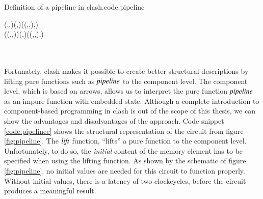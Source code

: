 \begin{texexptitled}{Definition of a pipeline in \gls{clash}.}{code:pipeline}\begin{hscode}\SaveRestoreHook
{}%
%
%
%
%
%
\>[3]{}\mathbin{::}\;(,,)\to (,)\to (\;(,,),){}\<[E]%
\\
\>[3]{}\;(\;(,,))\;(,){}\<[38]%
\>[38]{}\mathrel{=}(\;(,,),){}\<[E]%
\\
\>[3]{}\<[6]%
\>[6]{}\;{}\<[13]%
\>[13]{}\mathrel{=}\mathbin{*}\<[E]%
\\
\>[13]{}\mathrel{=}\<[E]%
\\
\>[13]{}\mathrel{=}\mathbin{+}\<[E]%
\ColumnHook
\end{hscode}\resethooks
\end{texexptitled}

Fortunately, \gls{clash} makes it possible to create better structural descriptions by lifting pure functions such as \ensuremath{\Varid{pipeline}} to the component level.
The component level, which is based on arrows\cite{hudak2003arrows}, allows us to interpret the pure function \ensuremath{\Varid{pipeline}} as an impure function with embedded state.
Although a complete introduction to component-based programming in \gls{clash} is out of the scope of this thesis, we can show the advantages and disadvantages of the approach.
Code snippet \ref{code:pipelinec} shows the structural representation of the circuit from figure \ref{fig:pipeline}.
The \ensuremath{\Varid{lift}} function, ``lifts'' a pure function to the component level.
Unfortunately, to do so, the \textit{initial} content of the memory element has to be specified when using the lifting function.
As shown by the schematic of figure \ref{fig:pipeline}, no initial values are needed for this circuit to function properly.
Without initial values, there is a latency of two clockcycles, before the circuit produces a meaningful result.

